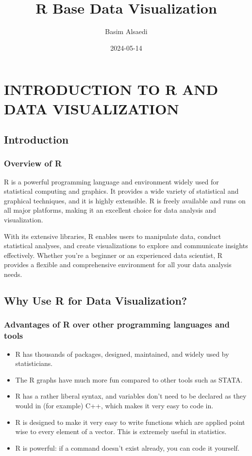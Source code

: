 \documentclass[
]{book}
\title{R Base Data Visualization}
\author{Basim Alsaedi}
\date{2024-05-14}
\providecommand{\tightlist}{%
  \setlength{\itemsep}{0pt}\setlength{\parskip}{0pt}}
\begin{document}
\maketitle

{
\setcounter{tocdepth}{1}
\tableofcontents
}
\chapter{INTRODUCTION TO R AND DATA VISUALIZATION}\label{introduction-to-r-and-data-visualization}

\section{Introduction}\label{introduction}

\subsection{Overview of R}\label{overview-of-r}

R is a powerful programming language and environment widely used for statistical computing and graphics. It provides a wide variety of statistical and graphical techniques, and it is highly extensible. R is freely available and runs on all major platforms, making it an excellent choice for data analysis and visualization.

With its extensive libraries, R enables users to manipulate data, conduct statistical analyses, and create visualizations to explore and communicate insights effectively. Whether you're a beginner or an experienced data scientist, R provides a flexible and comprehensive environment for all your data analysis needs.

\section{Why Use R for Data Visualization?}\label{why-use-r-for-data-visualization}

\subsection{Advantages of R over other programming languages and tools}\label{advantages-of-r-over-other-programming-languages-and-tools}

\begin{itemize}
\tightlist
\item
  R has thousands of packages, designed, maintained, and widely used by statisticians.
\item
  The R graphs have much more fun compared to other tools such as STATA.
\item
  R has a rather liberal syntax, and variables don't need to be
  declared as they would in (for example) C++, which makes it very easy to
  code in.
\item
  R is designed to make it very easy to write functions which
  are applied point wise to every element of a vector. This is extremely useful in statistics.
\item
  R is powerful: if a command doesn't exist already, you can code it yourself.
\end{itemize}
\end{document}
